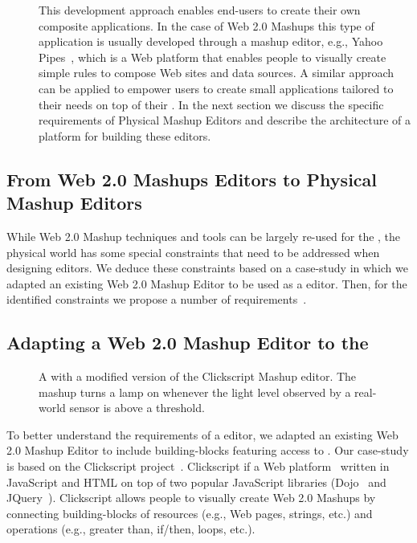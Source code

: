 \begin{description}
 \item[\mashupLevelC{}] This development approach enables end-users to create their own composite applications. In the case of Web 2.0 Mashups this type of application is usually developed through a mashup editor, e.g., Yahoo Pipes~, which is a Web platform that enables people to visually create simple rules to compose Web sites and data sources. A similar approach can be applied to empower users to create small applications tailored to their needs on top of their \sts{}. In the next section we discuss the specific requirements of Physical Mashup Editors and describe the architecture of a platform for building these editors. 
\end{description}

\subsection{From Web 2.0 Mashups Editors to Physical Mashup Editors}
While Web 2.0 Mashup techniques and tools can be largely re-used for the \WoTLong{}, the physical world has some special constraints that need to be addressed when designing \pMashups{} editors. We deduce these constraints based on a case-study in which we adapted an existing Web 2.0 Mashup Editor to be used as a \pMashups{} editor. Then, for the identified constraints we propose a number of requirements~\cite{Guinard2010-mashup-home}.

\subsection{Adapting a Web 2.0 Mashup Editor to the \WoTLong}\label{clickscript}
\begin{figure}
\caption{A \pMashup{} with a modified version of the Clickscript Mashup editor. The mashup turns a lamp on whenever the light level observed by a real-world sensor is above a threshold.}
\label{fig:cs-light-sensor}
\end{figure}
To better understand the requirements of a \pMashups{} editor, we adapted an existing Web 2.0 Mashup Editor to include building-blocks featuring access to \sts{}. Our case-study is based on the Clickscript project~\cite{Naef2009}. Clickscript if a Web platform~ written in JavaScript and HTML on top of two popular JavaScript libraries (Dojo~ and JQuery~). Clickscript allows people to visually create Web 2.0 Mashups by connecting building-blocks of resources (e.g., Web pages, strings, etc.) and operations (e.g., greater than, if/then, loops, etc.).

